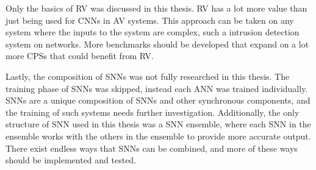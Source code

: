 Only the basics of \ac{RV} was discussed in this thesis.
\ac{RV} has a lot more value than just being used for \acp{CNN} in \ac{AV} systems.
This approach can be taken on any system where the inputs to the system are complex, such a intrusion detection system on networks. 
More benchmarks should be developed that expand on a lot more \acp{CPS} that could benefit from \ac{RV}.

Lastly, the composition of \acp{SNN} was not fully researched in this thesis.
The training phase of \acp{SNN} was skipped, instead each \ac{ANN} was trained individually.
\acp{SNN} are a unique composition of \acp{SNN} and other synchronous components, and the training of such systems needs further investigation.
Additionally, the only structure of \ac{SNN} used in this thesis was a \ac{SNN} ensemble, where each \ac{SNN} in the ensemble works with the others in the ensemble to provide more accurate output.
There exist endless ways that \acp{SNN} can be combined, and more of these ways should be implemented and tested.










